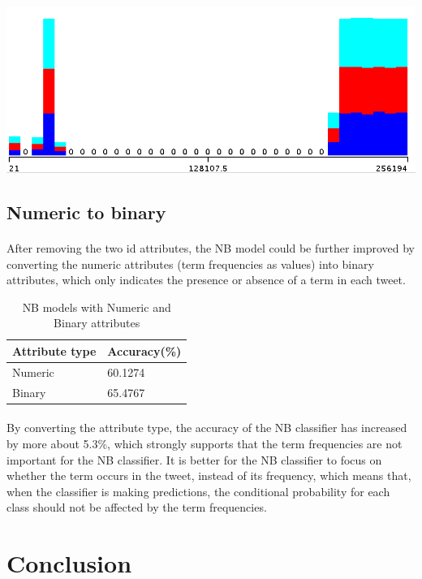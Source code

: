 \documentclass[11pt]{article}
\begin{document}
\includegraphics[scale=0.4]{"tid-class"}

\subsection{Numeric to binary}

\paragraph{} After removing the two id attributes, the NB model could be further improved by converting the numeric attributes (term frequencies as values) into binary attributes, which only indicates the presence or absence of a term in each tweet.
\begin{table}[!htbp]
 \begin{center}
\begin{tabular}{| l | l |}
      \hline
      Attribute type & Accuracy(\%) \\
      \hline\hline
      Numeric & 60.1274 \\
      Binary & 65.4767 \\
      \hline
\end{tabular}
\caption{NB models with Numeric and Binary attributes}\label{table3}
 \end{center}
\end{table}

\paragraph{} By converting the attribute type, the accuracy of the NB classifier has increased by more about 5.3\%, which strongly supports that the term frequencies are not important for the NB classifier. It is better for the NB classifier to focus on whether the term occurs in the tweet, instead of its frequency, which means that, when the classifier is making predictions, the conditional probability for each class should not be affected by the term frequencies.

\section{Conclusion}
\end{document}
